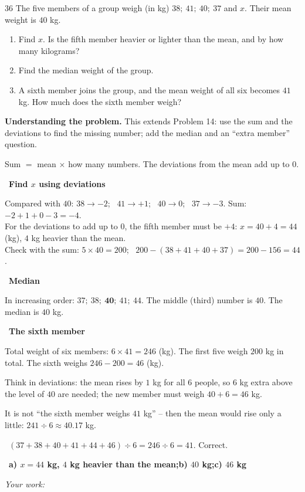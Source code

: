 \documentclass[11pt]{article}
\newif\ifsol \solfalse
\providecommand{\AnsWord}{Đáp số}
\newenvironment{probbox}[2]{\begin{probboxT}{#1}{#2}}{\end{probboxT}}
\newcommand{\StuProb}[2]{\begin{probboxS}{#1}{#2}\StuProbBody\end{probboxS}}
\newcommand{\ans}[1]{\par\smallskip{\bfseries\color{tmGreen!88!black}\AnsWord:}\ {\bfseries\color{AnsRed}#1}\par}
\newcommand{\probsol}[1]{%
  \begin{lrbox}{\solmeasure}\begin{minipage}{\dimexpr\linewidth-24pt\relax}#1\end{minipage}\end{lrbox}%
  \ifsol
    \begin{solbox}#1\end{solbox}%
  \else
    \setlength{\solht}{\dimexpr\ht\solmeasure+\dp\solmeasure+0.85cm\relax}%
    \ifdim\solht<1.35cm\setlength{\solht}{1.35cm}\fi
    \ifdim\solht>\StudentMaxWork\setlength{\solht}{\StudentMaxWork}\fi
    \par\noindent\begin{minipage}{\linewidth}%
    \expandafter\StuProb\StuProbArgs
    \begin{tcolorbox}[colback=white,colframe=Line,boxrule=0.8pt,arc=5pt,
      left=8pt,right=8pt,top=4pt,bottom=4pt,height=\solht]{\footnotesize\color{Slate}\itshape\WorkWord}\end{tcolorbox}%
    \end{minipage}\par\medskip
  \fi}
\newlength{\StudentMaxWork}\setlength{\StudentMaxWork}{4.5cm}
\newcommand{\step}[2]{\par\smallskip\noindent{\bfseries\color{tmBlue!85!black}\StepWord~#1.}\ {\bfseries #2}\par\nopagebreak}
\newcommand{\verify}[1]{\par\smallskip\noindent{\bfseries\color{tmGreen!80!black}\faCheckCircle\ \CheckWord}\ #1\par}
\def\WorkWord{Your work:}
\def\AnsWord{Answer}
\def\StepWord{Step}
\def\CheckWord{Check:}
\begin{document}

\begin{probbox}{36}{\relax}
The five members of a group weigh (in kg) $38;\ 41;\ 40;\ 37$ and $x$. Their mean weight is $40$ kg.
\begin{enumerate}[label=\alph*),leftmargin=1.6em,itemsep=0pt,topsep=2pt]
  \item Find $x$. Is the fifth member heavier or lighter than the mean, and by how many kilograms?
  \item Find the median weight of the group.
  \item A sixth member joins the group, and the mean weight of all six becomes $41$ kg. How much does the sixth member weigh?
\end{enumerate}
\end{probbox}
\probsol{
\textbf{Understanding the problem.} This extends Problem 14: use the sum and the deviations to find the missing number; add
the median and an ``extra member'' question.
\begin{recallbox}Sum $=$ mean $\times$ how many numbers. The deviations from the mean add up to $0$.\end{recallbox}
\step{1}{Find $x$ using deviations}
Compared with $40$: $38 \to -2$; \ $41 \to +1$; \ $40 \to 0$; \ $37 \to -3$. Sum: $-2 + 1 + 0 - 3 = -4$.\\
For the deviations to add up to $0$, the fifth member must be $+4$: $x = 40 + 4 = 44$ (kg), $4$ kg heavier than the mean.\\
Check with the sum: $5\times 40 = 200$; \ $200 - (38 + 41 + 40 + 37) = 200 - 156 = 44$.
\step{2}{Median}
In increasing order: $37;\ 38;\ \mathbf{40};\ 41;\ 44$. The middle (third) number is $40$. The median is $40$ kg.
\step{3}{The sixth member}
Total weight of six members: $6\times 41 = 246$ (kg). The first five weigh $200$ kg in total. The sixth weighs $246 - 200 = 46$ (kg).
\begin{tipbox}Think in deviations: the mean rises by $1$ kg for all $6$ people, so $6$ kg extra above the level of $40$ are needed;
the new member must weigh $40 + 6 = 46$ kg.\end{tipbox}
\begin{warnbox}It is not ``the sixth member weighs $41$ kg'' -- then the mean would rise only a little: $241 \div 6 \approx 40.17$ kg.\end{warnbox}
\verify{$(37 + 38 + 40 + 41 + 44 + 46) \div 6 = 246 \div 6 = 41$. Correct.}
\ans{a) $x = 44$ kg, $4$ kg heavier than the mean;\quad b) $40$ kg;\quad c) $46$ kg}
}
\end{document}
